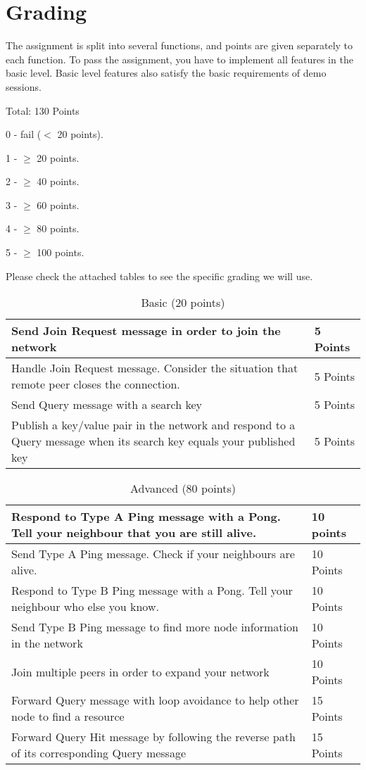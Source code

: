\documentclass[12pt, a4paper]{article}
\begin{document}
\section{Grading}
The assignment is split into several functions, and points are given separately to each function.
To pass the assignment, you have to implement all features in the basic level.
Basic level features also satisfy the basic requirements of demo sessions.

Total: 130 Points

0 - fail ($<$ 20 points).

1 - $\ge$ 20 points.

2 - $\ge$  40 points.

3 - $\ge$ 60 points.

4 - $\ge$ 80 points.

5 - $\ge$  100 points.

Please check the attached tables to see the specific grading we will use.

\begin{table}[htdp]
\caption{Basic (20 points)}
\begin{center}
\begin{tabular}{|p{12cm}|p{2cm}|}
\hline
Send Join Request message in order to join the network & 5 Points \\
\hline
Handle Join Request message. Consider the situation that remote peer closes the connection. & 5 Points\\
\hline
Send Query message with a search key & 5 Points  \\
\hline
Publish a key/value pair in the network and respond to a Query message when its search key equals your published key & 5 Points \\
\hline
\end{tabular}
\end{center}
\end{table}

\begin{table}[htdp]
\caption{Advanced (80 points)}
\begin{center}
\begin{tabular}{|p{12cm}|p{2cm}|}
\hline
Respond to Type A Ping message with a Pong.
Tell your neighbour that you are still alive. & 10 points \\
\hline
Send Type A Ping message.
Check if your neighbours are alive. & 10 Points \\
\hline
Respond to Type B Ping message with a Pong.
Tell your neighbour who else you know. & 10 Points \\
\hline
Send Type B Ping message to find more node information in the network & 10 Points \\
\hline
Join multiple peers in order to expand your network & 10 Points \\
\hline
Forward Query message with loop avoidance to help other node to find a resource & 15 Points \\
\hline
Forward Query Hit message by following the reverse path of its corresponding Query message & 15 Points \\
\hline
\end{tabular}
\end{center}
\end{table}
\end{document}
